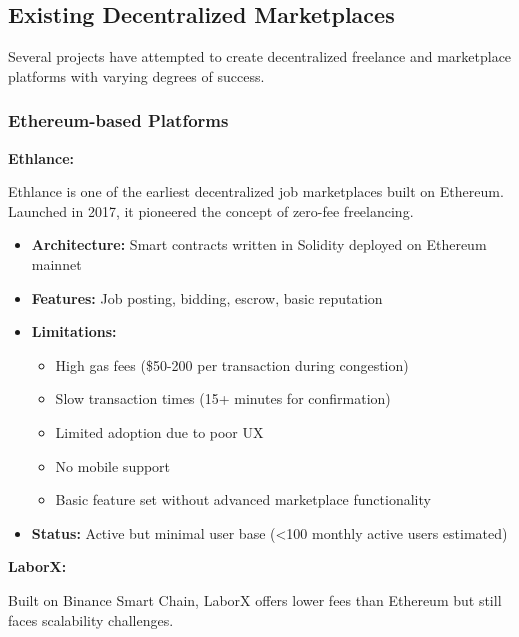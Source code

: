 \documentclass[a4paper,13pt,twoside]{report}
\theoremstyle{definition}
\begin{document}
\subsection{Existing Decentralized Marketplaces}

Several projects have attempted to create decentralized freelance and marketplace platforms with varying degrees of success.

\subsubsection{Ethereum-based Platforms}

\textbf{Ethlance:}

Ethlance is one of the earliest decentralized job marketplaces built on Ethereum. Launched in 2017, it pioneered the concept of zero-fee freelancing.

\begin{itemize}
    \item \textbf{Architecture:} Smart contracts written in Solidity deployed on Ethereum mainnet
    \item \textbf{Features:} Job posting, bidding, escrow, basic reputation
    \item \textbf{Limitations:}
    \begin{itemize}
        \item High gas fees (\$50-200 per transaction during congestion)
        \item Slow transaction times (15+ minutes for confirmation)
        \item Limited adoption due to poor UX
        \item No mobile support
        \item Basic feature set without advanced marketplace functionality
    \end{itemize}
    \item \textbf{Status:} Active but minimal user base (<100 monthly active users estimated)
\end{itemize}

\textbf{LaborX:}

Built on Binance Smart Chain, LaborX offers lower fees than Ethereum but still faces scalability challenges.
\end{document}
